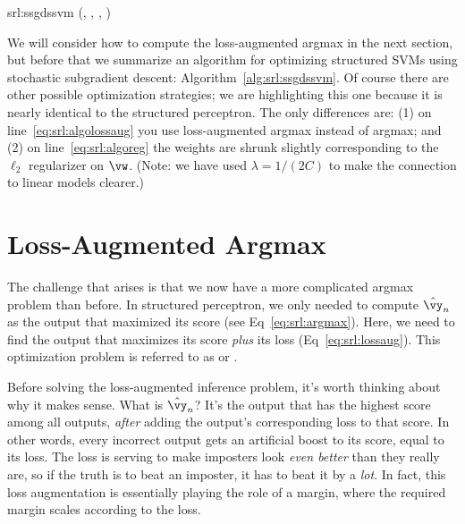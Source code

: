 \newalgorithm%
  {srl:ssgdssvm}%
  {(, , \VARm{\lambda}, \VARm{\ell})}
  {
        \SETST{$\hat \vy$}{$\argmax_{\VARm{\hat\vy} \in \cY(\VARm{\vx})} \dotp{\VARm{\vw}}{\phi(\VARm{\vx},\VARm{\hat\vy})} + \VARm{\ell}(\VARm{\vy}, \VARm{\hat\vy})$} \label{eq:srl:algolossaug}
        \IF{\VAR{$\hat \vy$} $\neq$ \VAR{$\vy$}}
          \SETST{$\vw$}{$\VARm{\vw} + \phi(\VARm{\vx}, \VARm{\vy}) - \phi(\VARm{\vx}, \VARm{\hat \vy})$}
        \ENDIF
         \label{eq:srl:algoreg}
      \ENDFOR
    \ENDFOR
    \RETURN \VAR{$\vw$}
  }


We will consider how to compute the loss-augmented argmax in the next section,
but before that we summarize an algorithm for optimizing structured SVMs using stochastic subgradient descent: Algorithm~\ref{alg:srl:ssgdssvm}. Of course there are other possible optimization strategies; we are highlighting this one because it is nearly identical to the structured perceptron.
The only differences are: (1) on line~\ref{eq:srl:algolossaug} you use loss-augmented argmax instead of argmax; and (2) on line~\ref{eq:srl:algoreg} the weights are shrunk slightly corresponding to the $\ell_2$ regularizer on $\vw$. (Note: we have used $\lambda = 1/(2C)$ to make the connection to linear models clearer.)


\section{Loss-Augmented Argmax}

The challenge that arises is that we now have a more complicated argmax problem than before.
In structured perceptron, we only needed to compute $\hat\vy_n$ as the output that maximized its score (see Eq~\ref{eq:srl:argmax}).
Here, we need to find the output that maximizes its score \emph{plus} its loss (Eq~\eqref{eq:srl:lossaug}).
This optimization problem is referred to as  or .

Before solving the loss-augmented inference problem, it's worth thinking about why it makes sense.
What is $\hat\vy_n$?
It's the output that has the highest score among all outputs, \emph{after} adding the output's corresponding loss to that score.
In other words, every incorrect output gets an artificial boost to its score, equal to its loss.
The loss is serving to make imposters look \emph{even better} than they really are, so if the truth is to beat an imposter, it has to beat it by a \emph{lot}.
In fact, this loss augmentation is essentially playing the role of a margin, where the required margin scales according to the loss.

